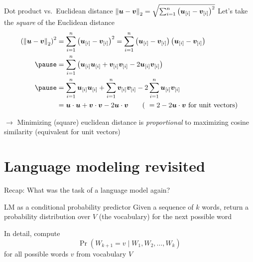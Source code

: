 \documentclass[12pt,aspectratio=169,handout]{beamer}
\begin{document}
\begin{frame}{Dot product vs.\ Euclidean distance $\norm{\bm{u} - \bm{v}}_{2} = \sqrt{\sum_{i = 1}^{n} \left( \bm{u}_{[i]} - \bm{v}_{[i]} \right)^2}$}
Let's take the \emph{square} of the Euclidean distance
	$$
	\begin{aligned}
		\left(\norm{\bm{u} - \bm{v}}_{2}\right)^2 &=
		\sum_{i = 1}^{n} \left( \bm{u}_{[i]} - \bm{v}_{[i]} \right)^2 
		=
		\sum_{i = 1}^{n} \left( \bm{u}_{[i]} - \bm{v}_{[i]} \right) \left( \bm{u}_{[i]} - \bm{v}_{[i]} \right) \\ \pause
		&=
		\sum_{i = 1}^{n} \left( \bm{u}_{[i]} \bm{u}_{[i]} + \bm{v}_{[i]} \bm{v}_{[i]} - 2 \bm{u}_{[i]} \bm{v}_{[i]} \right)  \\ \pause
		&= \sum_{i = 1}^{n}  \bm{u}_{[i]} \bm{u}_{[i]} + \sum_{i = 1}^{n} \bm{v}_{[i]} \bm{v}_{[i]} - 2 \sum_{i = 1}^{n} \bm{u}_{[i]} \bm{v}_{[i]} \\
		&= \bm{u} \cdot \bm{u} + \bm{v} \cdot \bm{v} - 2 \bm{u} \cdot \bm{v} \qquad
		\text{( } = 2 - 2 \bm{u} \cdot \bm{v} \text{ for unit vectors)}\\
	\end{aligned}
	$$
	
	\pause
	
$\to$ Minimizing (square) euclidean distance is \emph{proportional} to maximizing cosine similarity (equivalent for unit vectors)

	
	
\end{frame}






\section{Language modeling revisited}


\begin{frame}{Recap: What was the task of a language model again?}

\begin{block}{LM as a conditional probability predictor}
Given a sequence of $k$ words, return a probability distribution over $V$ (the vocabulary) for the next possible word
\end{block}

In detail, compute
$$
\Pr(W_{k+1} = v \mid W_1, W_2, \ldots, W_k)
$$
for all possible words $v$ from vocabulary $V$

\end{frame}
\end{document}
